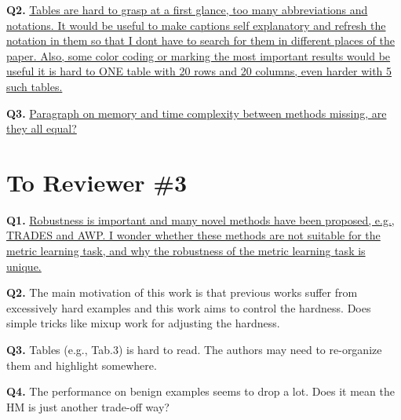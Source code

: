 \documentclass[10pt,twocolumn,letterpaper]{article}
\begin{document}
\noindent\textbf{Q2.}
%
\ul{
Tables are hard to grasp at a first glance, too many abbreviations and
notations. It would be useful to make captions self explanatory and refresh the
notation in them so that I dont have to search for them in different places of
the paper. Also, some color coding or marking the most important results would
be useful it is hard to ONE table with 20 rows and 20 columns, even harder with
5 such tables.
}

\noindent\textbf{Q3.}
%
\ul{
Paragraph on memory and time complexity between methods missing, are they all
equal?
}

\section*{To Reviewer \#3}

\noindent\textbf{Q1.}
%
\ul{
Robustness is important and many novel methods have been proposed, e.g., TRADES and AWP. I wonder whether these methods are not suitable for the metric learning task, and why the robustness of the metric learning task is unique.
}

\noindent\textbf{Q2.}
%
The main motivation of this work is that previous works suffer from excessively hard examples and this work aims to control the hardness. Does simple tricks like mixup work for adjusting the hardness.

\noindent\textbf{Q3.}
%
Tables (e.g., Tab.3) is hard to read. The authors may need to re-organize them and highlight somewhere.

\noindent\textbf{Q4.}
%
The performance on benign examples seems to drop a lot. Does it mean the HM is just another trade-off way?

{\small


}
\end{document}
